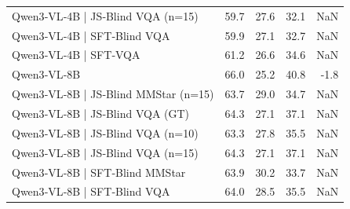 \begin{tabular}{lrrrr}
Qwen3‑VL‑4B | JS‑Blind VQA (n=15) & 59.7 & 27.6 & 32.1 & NaN \\
Qwen3‑VL‑4B | SFT‑Blind VQA & 59.9 & 27.1 & 32.7 & NaN \\
Qwen3‑VL‑4B | SFT‑VQA & 61.2 & 26.6 & 34.6 & NaN \\
Qwen3‑VL‑8B & 66.0 & 25.2 & 40.8 & -1.8 \\
Qwen3‑VL‑8B | JS‑Blind MMStar (n=15) & 63.7 & 29.0 & 34.7 & NaN \\
Qwen3‑VL‑8B | JS‑Blind VQA (GT) & 64.3 & 27.1 & 37.1 & NaN \\
Qwen3‑VL‑8B | JS‑Blind VQA (n=10) & 63.3 & 27.8 & 35.5 & NaN \\
Qwen3‑VL‑8B | JS‑Blind VQA (n=15) & 64.3 & 27.1 & 37.1 & NaN \\
Qwen3‑VL‑8B | SFT‑Blind MMStar & 63.9 & 30.2 & 33.7 & NaN \\
Qwen3‑VL‑8B | SFT‑Blind VQA & 64.0 & 28.5 & 35.5 & NaN \\
\bottomrule
\end{tabular}
